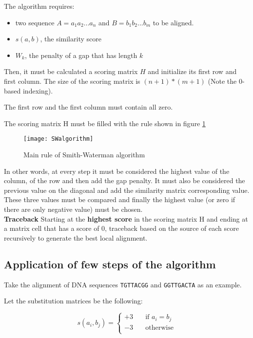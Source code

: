 The algorithm requires:

\begin{itemize}
  \item two sequence $A = a_{1}a_{2}...a_{n}$ and $B = b_{1}b_{2}...b_{m}$ to
be aligned.
  \item $s(a,b)$, the similarity score
  \item $W_k$, the penalty of a gap that has length $k$
\end{itemize}

Then, it must be calculated a scoring matrix $H$ and initialize its first
row and first column.
The size of the scoring matrix is $(n + 1)*(m + 1)$ (Note the 0-based
indexing).

The first row and the first column must contain all zero.

The scoring matrix H must be filled with the rule shown in figure
\ref{fig:swalgorithm}

\begin{figure}[H]
  \centering
  \texttt{[image: SWalgorithm]}
  \caption{Main rule of Smith-Waterman algorithm}
  \label{fig:swalgorithm}
\end{figure}

In other words, at every step it must be considered the highest value
of the column, of the row and then add the gap penalty. It must also
be considered the previous value on the diagonal and add the
similarity matrix corresponding value. These three values must be
compared and finally the highest value (or zero if there are only
negative value) must be chosen. \\

\textbf{Traceback}
Starting at the \textbf{highest score} in the scoring matrix H and ending at a
matrix cell that has a score of 0, traceback based on the source of
each score recursively to generate the best local alignment.

\subsection{Application of few steps of the algorithm}

Take the alignment of DNA sequences \texttt{TGTTACGG} and
\texttt{GGTTGACTA} as an example.

Let the substitution matrices be the following:

\[ s(a_i,b_j) =
  \begin{cases}
    +3       & \quad \text{if } a_i = b_j\\
    -3	     & \quad \text{otherwise} \\
  \end{cases}
\]

